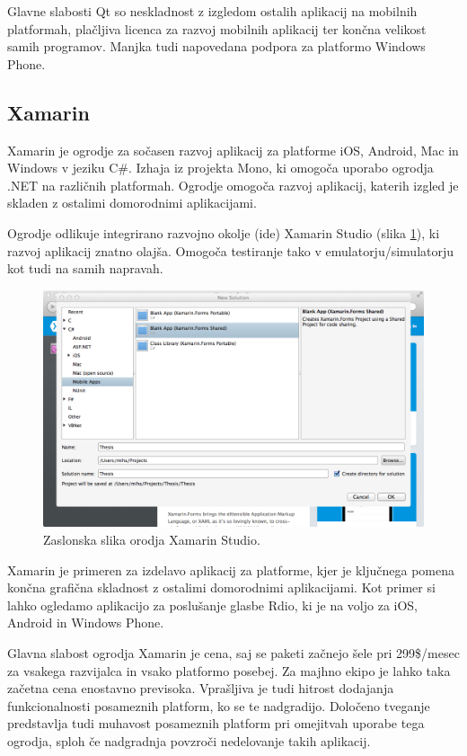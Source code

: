 Glavne slabosti Qt so neskladnost z izgledom ostalih aplikacij na mobilnih platformah, plačljiva licenca za razvoj mobilnih aplikacij ter končna velikost samih programov. Manjka tudi napovedana podpora za platformo Windows Phone.

\subsection{Xamarin}

Xamarin\cite{xamarin} je ogrodje za sočasen razvoj aplikacij za platforme iOS, Android, Mac in Windows v jeziku C\#. Izhaja iz projekta Mono\cite{mono}, ki omogoča uporabo ogrodja .NET\cite{dotnet} na različnih platformah. Ogrodje omogoča razvoj aplikacij, katerih izgled je skladen z ostalimi domorodnimi aplikacijami.

Ogrodje odlikuje integrirano razvojno okolje (\gls{ide}) Xamarin Studio (slika \ref{fig:xamarin}), ki razvoj aplikacij znatno olajša. Omogoča testiranje tako v emulatorju/simulatorju kot tudi na samih napravah.

\begin{figure}
 \includegraphics[width=\linewidth]{xamarin}
 \caption{Zaslonska slika orodja Xamarin Studio.}
 \label{fig:xamarin}
\end{figure}

Xamarin je primeren za izdelavo aplikacij za platforme, kjer je ključnega pomena končna grafična skladnost z ostalimi domorodnimi aplikacijami. Kot primer si lahko ogledamo aplikacijo za poslušanje glasbe Rdio\cite{rdio}, ki je na voljo za iOS, Android in Windows Phone.

Glavna slabost ogrodja Xamarin je cena, saj se paketi začnejo šele pri 299\$/mesec za vsakega razvijalca in vsako platformo posebej. Za majhno ekipo je lahko taka začetna cena enostavno previsoka. Vprašljiva je tudi hitrost dodajanja funkcionalnosti posameznih platform, ko se te nadgradijo. Določeno tveganje predstavlja tudi muhavost posameznih platform pri omejitvah uporabe tega ogrodja, sploh če nadgradnja povzroči nedelovanje takih aplikacij.

